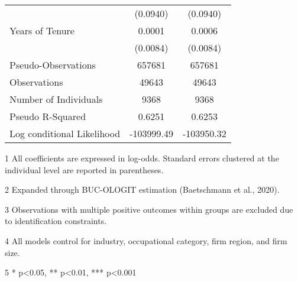 \begin{table}[!h]
{\begin{threeparttable}
\begin{tabular}[t]{lcc}
 & (0.0940) & (0.0940)\\
Years of Tenure & 0.0001 & 0.0006\\
 & (0.0084) & (0.0084)\\
\hline
\addlinespace
Pseudo-Observations & 657681 & 657681\\
Observations & 49643 & 49643\\
Number of Individuals & 9368 & 9368\\
Pseudo R-Squared & 0.6251 & 0.6253\\
Log conditional Likelihood & -103999.49 & -103950.32\\
\bottomrule
\end{tabular}
\begin{tablenotes}
\item[1] All coefficients are expressed in log-odds. Standard errors clustered at the individual level are reported in parentheses.
\item[2] Expanded through BUC-OLOGIT estimation (Baetschmann et al., 2020).
\item[3] Observations with multiple positive outcomes within groups are excluded due to identification constraints.
\item[4] All models control for industry, occupational category, firm region, and firm size.
\item[5] * p<0.05, ** p<0.01,  *** p<0.001
\end{tablenotes}
\end{threeparttable}}
\end{table}
